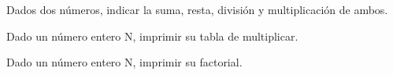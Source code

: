 \begin{partes}
  \item Dados dos números, indicar la suma, resta, división y multiplicación de ambos.
  \item Dado un número entero N, imprimir su tabla de multiplicar.
  \item Dado un número entero N, imprimir su factorial.
\end{partes}

